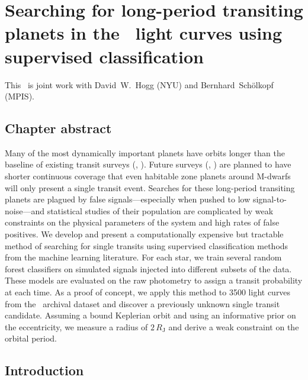 \renewcommand{\chapid}{ketu}

\renewcommand{\kepler}{\project{Kepler}}
\newcommand{\plato}{\project{PLATO}}

\renewcommand{\period}{{\ensuremath{P}}}
\newcommand{\rp}{{\ensuremath{R_\mathrm{P}}}}
\renewcommand{\rate}{{\ensuremath{\Gamma}}}
\newcommand{\score}{{\ensuremath{S}}}


\chapter{%
    Searching for long-period transiting planets in the \kepler\ light curves
    using supervised classification}

This \paper\ is joint work with David~W.~Hogg (NYU) and Bernhard~Sch\"olkopf
(MPIS).

\section{Chapter abstract}

Many of the most dynamically important planets have orbits longer than the
baseline of existing transit surveys (\kepler, \KT).
Future surveys (\tess, \plato) are planned to have shorter continuous coverage
that even habitable zone planets around M-dwarfs will only present a single
transit event.
Searches for these long-period transiting planets are plagued by false
signals---especially when pushed to low signal-to-noise---and statistical
studies of their population are complicated by weak constraints on the
physical parameters of the system and high rates of false positives.
We develop and present a computationally expensive but tractable method of
searching for single transits using supervised classification methods from
the machine learning literature.
For each star, we train several random forest classifiers on simulated signals
injected into different subsets of the data.
These models are evaluated on the raw photometry to assign a transit
probability at each time.
As a proof of concept, we apply this method to 3500 light curves from the
\kepler\ archival dataset and discover a previously unknown single transit
candidate.
Assuming a bound Keplerian orbit and using an informative prior on the
eccentricity, we measure a radius of $2\,R_\mathrm{J}$ and derive a weak
constraint on the orbital period.

\section{Introduction}

